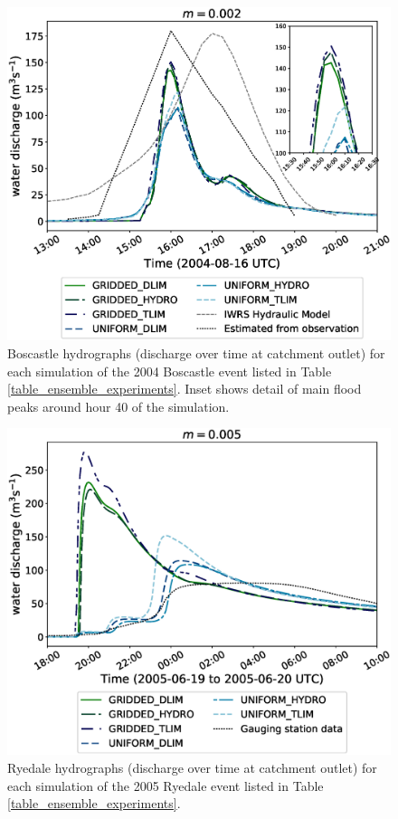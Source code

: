 \begin{figure}[!htbp]
\includegraphics[width=14cm]{chp_flood_figs_scripts/fig_hydrographs_boscastle_new.eps}
\caption{Boscastle hydrographs (discharge over time at catchment outlet) for each simulation of the 2004 Boscastle event listed in Table \ref{table_ensemble_experiments}. Inset shows detail of main flood peaks around hour 40 of the simulation.}
\label{fig_boscastle_hydrograph_ensemble}
\end{figure}

\begin{figure}[!htbp]
\includegraphics[width=14cm]{chp_flood_figs_scripts/fig_hydrographs_ryedale_new.eps}
\caption{Ryedale hydrographs (discharge over time at catchment outlet) for each simulation of the 2005 Ryedale event listed in Table \ref{table_ensemble_experiments}.}
\label{fig_ryedale_hydrograph_ensemble}
\end{figure}

